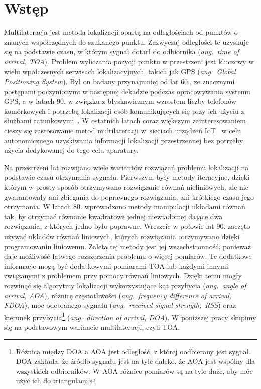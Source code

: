 \chapter*{Wstęp}\label{chap:introduction}

Multilateracja jest metodą lokalizacji opartą na odległościach od punktów o znanych współrzędnych do szukanego punktu. Zazwyczaj odległości te uzyskuje się na podstawie czasu, w którym sygnał dotarł do odbiornika (\textit{ang.\ time of arrival, TOA}). Problem wyliczania pozycji punktu w przestrzeni jest kluczowy w wielu wpółczesnych serwisach lokalizacyjnych, takich jak GPS (\textit{ang.\ Global Positioning System}). Był on badany przynajmniej od lat 60., ze znacznymi postępami poczynionymi w następnej dekadzie podczas opracowywania systemu GPS, a w latach 90. w związku z błyskawicznym wzrostem liczby telefonów komórkowych i potrzebą lokalizacji osób komunikujących się przy ich użyciu z służbami ratunkowymi~\cite{govinfo}. W ostatnich latach coraz większym zainteresowaniem cieszy się zastosowanie metod multilateracji w~sieciach urządzeń IoT~\cite{9184896} w celu autonomicznego uzyskiwania informacji lokalizacji przestrzennej bez potrzeby użycia dedykowanej do tego celu aparatury.

Na przestrzeni lat rozwijano wiele wariantów rozwiązań problemu lokalizacji na podstawie czasu otrzymania sygnału. Pierwszym były metody iteracyjne, dzięki którym w prosty sposób otrzymywano rozwiązanie równań nieliniowych, ale nie gwarantowały ani zbiegania do poprawnego rozwiązania, ani krótkiego czasu jego otrzymania. W latach 80. wprowadzono metody manipulacji układami równań tak, by otrzymać równanie kwadratowe jednej niewiadomej dające dwa rozwiązania, z których jedno było poprawne. Wreszcie w połowie lat 90. zaczęto używać układów równań liniowych, których rozwiązania otrzymywano dzięki programowaniu liniowemu. Zaletą tej metody jest jej wszechstronność, ponieważ daje możliwość łatwego rozszerzenia problemu o więcej pomiarów. Te dodatkowe informacje mogą być dodatkowymi  pomiarami TOA lub każdymi innymi związanymi z problemem przy pomocy równań liniowych. Dzięki temu mogły rozwinąć się algorytmy lokalizacji wykorzystujące kąt przybycia (\textit{ang.\ angle of arrival, AOA}), różnicę częstotliwości (\textit{ang.\ frequency difference of arrival, FDOA}), moc odebranego sygnału (\textit{ang.\ received signal strength,\ RSS}) oraz kierunek przybycia\footnote{Różnicą między DOA a AOA jest odległość, z której oodbierany jest sygnał. DOA zakłada, że źródło sygnału jest na tyle daleko, że AOA jest wspólny dla wszystkich odbiorników. W AOA różnice pomiarów są na tyle duże, aby móc użyć ich do triangulacji.} (\textit{ang.\ direction of arrival, DOA}). W poniższej pracy skupimy się na podstawowym wariancie multilateracji, czyli TOA.

